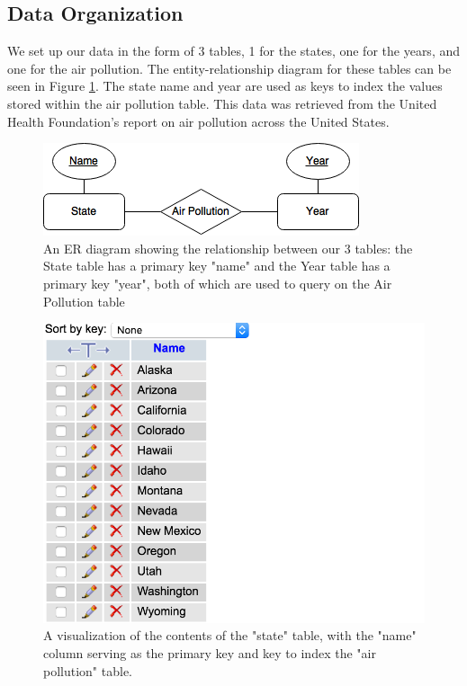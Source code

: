 \documentclass[journal]{vgtc}                %
\begin{document}
\subsection{Data Organization}

We set up our data in the form of 3 tables, 1 for the states, one for the years, and one for the air pollution. The 
entity-relationship diagram for these tables can be seen in Figure \ref{fig:ERdiagram}. 
The state name and year are used as keys to index the values stored within the air pollution table. This data was 
retrieved from the United Health Foundation's report on air pollution across the United States.

\begin{figure}
 \centering %
 \includegraphics[width=\columnwidth]{cs458-ER-diagram-ass1}
 \caption{An ER diagram showing the relationship between our 3 tables: the State table has a primary key "name" and the Year table has a primary key "year", both of which are used to query on the Air Pollution table}
 \label{fig:ERdiagram}
\end{figure}


\begin{figure}
\centering
\includegraphics[width=\columnwidth]{state_db}
\caption{A visualization of the contents of the "state" table, with the "name" column serving as the primary key and key to index the "air pollution" table.}
\label{fig:stateDB}
\end{figure}
\end{document}
